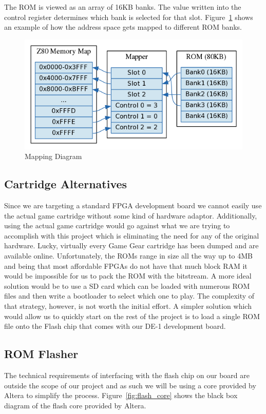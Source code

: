 \documentclass{article}
\begin{document}
The ROM is viewed as an array of 16KB banks. The value written into 
the control register determines which bank is selected for 
that slot. Figure~\ref{fig:mapping_diagram} shows an example of
how the address space gets mapped to different ROM banks.

\begin{figure}[H]
\centering
\includegraphics[scale=0.4]{mapper.png}
\caption{Mapping Diagram}
\label{fig:mapping_diagram}
\end{figure}

\subsection{Cartridge Alternatives}
Since we are targeting a standard FPGA development board we cannot
easily use the actual game cartridge without some kind of hardware adaptor.
Additionally, using the actual game cartridge would go
against what we are trying to accomplish with this project which is
eliminating the need for any of the original hardware. Lucky, virtually
every Game Gear cartridge has been dumped and are available online.
Unfortunately, the ROMs range in size all the way up to 4MB and being that
most affordable FPGAs do not have that much block RAM it would be
impossible for us to pack the ROM with the bitstream. A more ideal
solution would be to use a SD card which can be loaded with numerous
ROM files and then write a bootloader to select which one to play.
The complexity of that strategy, however, is not worth the initial
effort. A simpler solution which would allow us to quickly start on the
rest of the project is to load a single ROM file onto the Flash chip
that comes with our DE-1 development board.

\subsection{ROM Flasher}
The technical requirements of interfacing with the flash chip on our board
are outside the scope of our project and as such we will be using
a core provided by Altera \cite{flash_core} to simplify the process.
Figure~\ref{fig:flash_core} shows the black box diagram of the flash core provided
by Altera.
\end{document}
